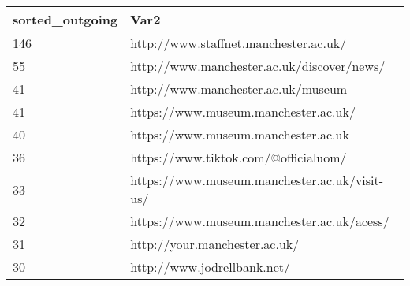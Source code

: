 \begin{tabular}{ll}
sorted_outgoing & Var2 \\ 
\hline 
146 & http://www.staffnet.manchester.ac.uk/ \\ 
55 & http://www.manchester.ac.uk/discover/news/ \\ 
41 & http://www.manchester.ac.uk/museum \\ 
41 & https://www.museum.manchester.ac.uk/ \\ 
40 & https://www.museum.manchester.ac.uk \\ 
36 & https://www.tiktok.com/@officialuom/ \\ 
33 & https://www.museum.manchester.ac.uk/visit-us/ \\ 
32 & https://www.museum.manchester.ac.uk/acess/ \\ 
31 & http://your.manchester.ac.uk/ \\ 
30 & http://www.jodrellbank.net/ \\ 
\hline 
\end{tabular}
